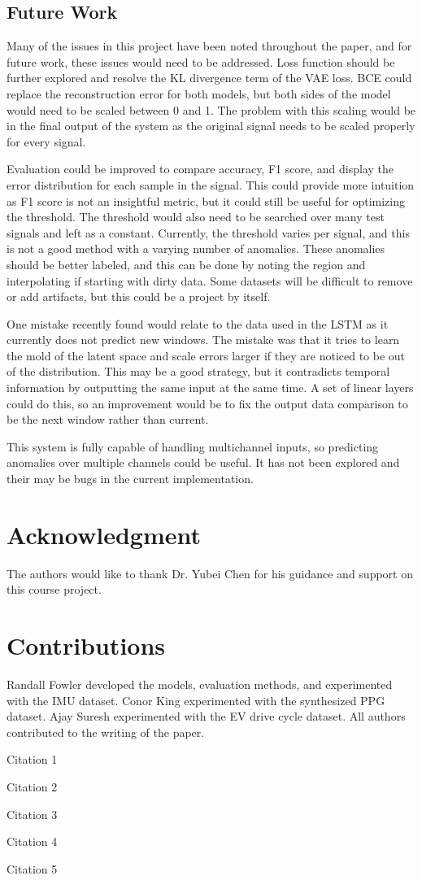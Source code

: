 \documentclass[conference]{IEEEtran}
\begin{document}
\subsection{Future Work}
Many of the issues in this project have been noted throughout the paper, and for future work, these issues would need to be addressed. Loss function should be further explored and resolve the KL divergence term of the VAE loss. BCE could replace the reconstruction error for both models, but both sides of the model would need to be scaled between 0 and 1. The problem with this scaling would be in the final output of the system as the original signal needs to be scaled properly for every signal.

Evaluation could be improved to compare accuracy, F1 score, and display the error distribution for each sample in the signal. This could provide more intuition as F1 score is not an insightful metric, but it could still be useful for optimizing the threshold. The threshold would also need to be searched over many test signals and left as a constant. Currently, the threshold varies per signal, and this is not a good method with a varying number of anomalies. These anomalies should be better labeled, and this can be done by noting the region and interpolating if starting with dirty data. Some datasets will be difficult to remove or add artifacts, but this could be a project by itself.

One mistake recently found would relate to the data used in the LSTM as it currently does not predict new windows. The mistake was that it tries to learn the mold of the latent space and scale errors larger if they are noticed to be out of the distribution. This may be a good strategy, but it contradicts temporal information by outputting the same input at the same time. A set of linear layers could do this, so an improvement would be to fix the output data comparison to be the next window rather than current.

This system is fully capable of handling multichannel inputs, so predicting anomalies over multiple channels could be useful. It has not been explored and their may be bugs in the current implementation.


\section*{Acknowledgment}
The authors would like to thank Dr. Yubei Chen for his guidance and support on this course project.

\section*{Contributions}
Randall Fowler developed the models, evaluation methods, and experimented with the IMU dataset. 
Conor King experimented with the synthesized PPG dataset. 
Ajay Suresh experimented with the EV drive cycle dataset. 
All authors contributed to the writing of the paper.

\begin{thebibliography}{1}


Citation 1

Citation 2

Citation 3

Citation 4

Citation 5

\end{thebibliography}
\end{document}
